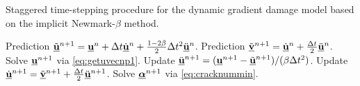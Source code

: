 \begin{algorithm}[htbp]
\caption{Staggered time-stepping procedure for the dynamic gradient damage model based on the implicit Newmark-$\beta$ method.} \label{algo:implicit}
\begin{algorithmic}[1]\linespread{1.2}\selectfont\normalsize
{}
  \State Prediction $\tilde{\uvec}^{n+1}=\uvec^n+\Delta t\dot{\uvec}^n+\frac{1-2\beta}{2}\Delta t^2\ddot{\uvec}^n$.
  \State Prediction $\tilde{\underline{\vec{v}}}^{n+1}=\dot{\uvec}^n+\frac{\Delta t}{2}\ddot{\uvec}^n$.
  \State Solve $\uvec^{n+1}$ via \eqref{eq:getuvecnp1}.
  \State Update $\ddot{\uvec}^{n+1}=(\uvec^{n+1}-\tilde{\uvec}^{n+1})/(\beta\Delta t^2)$.
  \State Update $\dot{\uvec}^{n+1}=\tilde{\underline{\vec{v}}}^{n+1}+\frac{\Delta t}{2}\ddot{\uvec}^{n+1}$.
  \State Solve $\dvec^{n+1}$ via \eqref{eq:cracknummin}.
\EndFor
\end{algorithmic}
\end{algorithm}

